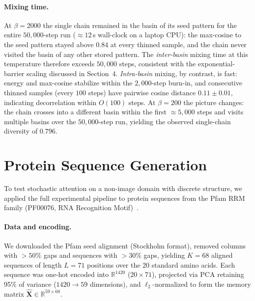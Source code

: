 \paragraph{Mixing time.}
At $\beta{=}2000$ the single chain remained in the basin of its seed pattern for the entire $50{,}000$-step run (${\approx}12$\,s wall-clock on a laptop CPU): the max-cosine to the seed pattern stayed above $0.84$ at every thinned sample, and the chain never visited the basin of any other stored pattern. The \emph{inter-basin} mixing time at this temperature therefore exceeds $50{,}000$ steps, consistent with the exponential-barrier scaling discussed in Section~4. \emph{Intra-basin} mixing, by contrast, is fast: energy and max-cosine stabilize within the $2{,}000$-step burn-in, and consecutive thinned samples (every $100$ steps) have pairwise cosine distance $0.11\pm0.01$, indicating decorrelation within $O(100)$ steps. At $\beta{=}200$ the picture changes: the chain crosses into a different basin within the first ${\approx}5{,}000$ steps and visits multiple basins over the $50{,}000$-step run, yielding the observed single-chain diversity of $0.796$.

\section{Protein Sequence Generation}\label{app:protein}

To test stochastic attention on a non-image domain with discrete structure, we applied the full experimental pipeline to protein sequences from the Pfam RRM family (PF00076, RNA Recognition Motif)~\cite{mistryPfamProteinFamilies2021}.

\paragraph{Data and encoding.}
We downloaded the Pfam seed alignment (Stockholm format), removed columns with $>50\%$ gaps and sequences with $>30\%$ gaps, yielding $K{=}68$ aligned sequences of length $L{=}71$ positions over the 20 standard amino acids. Each sequence was one-hot encoded into $\mathbb{R}^{1420}$ ($20\times 71$), projected via PCA retaining 95\% of variance ($1420\to 59$ dimensions), and $\ell_2$-normalized to form the memory matrix $\hat{\mathbf{X}}\in\mathbb{R}^{59\times 68}$.

